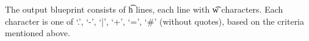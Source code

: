 The output blueprint consists of \t{h} lines, each line with \t{w} characters.
Each character is one of \t{`.'}, \t{`-'}, \t{`|'}, \t{`+'}, \t{`='}, \t{`\#'} (without quotes), based on the criteria mentioned above.
